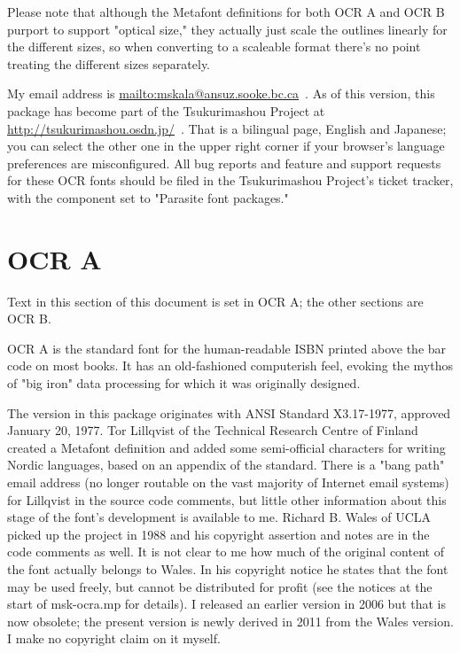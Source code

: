 \documentclass{article}
\begin{document}
Please note that although the Metafont definitions for both OCR A and OCR B
purport to support "optical size," they actually just scale the outlines
linearly for the different sizes, so when converting to a scaleable format
there's no point treating the different sizes separately.

My email address is \url{mailto:mskala@ansuz.sooke.bc.ca}~.  As of this
version, this package has become part of the Tsukurimashou Project at
\url{http://tsukurimashou.osdn.jp/}~.  That is a bilingual page,
English and Japanese; you can select the other one in the upper right corner
if your browser's language preferences are misconfigured.  All bug reports
and feature and support requests for these OCR fonts should be filed in the
Tsukurimashou Project's ticket tracker, with the component set to "Parasite
font packages."

\setmainfont{OCRA.otf}
\setmonofont{OCRA.otf}
\section{OCR A}

Text in this section of this document is set in OCR A; the other sections
are OCR B.

OCR A is the standard font for the human-readable ISBN printed above the bar
code on most books.  It has an old-fashioned computerish feel, evoking the
mythos of "big iron" data processing for which it was originally designed.

The version in this package originates with ANSI Standard X3.17-1977,
approved January 20, 1977.  Tor Lillqvist of the Technical Research Centre
of Finland created a Metafont definition and added some semi-official
characters for writing Nordic languages, based on an appendix of the
standard.  There is a "bang path" email address (no longer routable on the
vast majority of Internet email systems) for Lillqvist in the source code
comments, but little other information about this stage of the font's
development is available to me.  Richard B. Wales of UCLA picked up the
project in 1988 and his copyright assertion and notes are in the code
comments as well.  It is not clear to me how much of the original content of
the font actually belongs to Wales.  In his copyright notice he states that
the font may be used freely, but cannot be distributed for profit (see the
notices at the start of msk-ocra.mp for details).
I released an earlier version in 2006
but that is now obsolete; the present version is newly derived in 2011 from
the Wales version.  I make no copyright claim on it myself.
\end{document}
